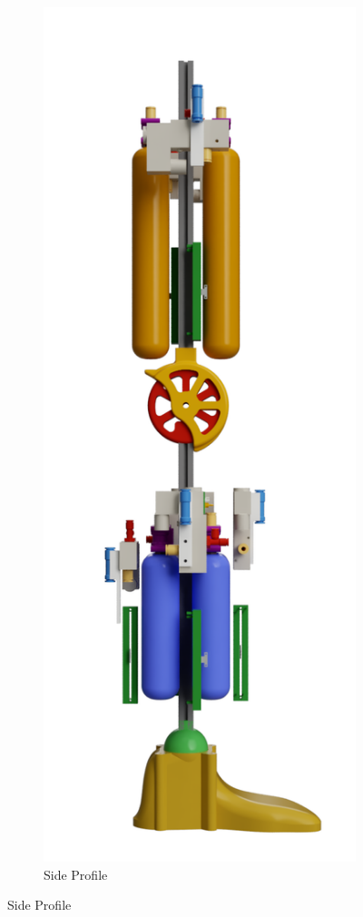 \documentclass[11pt,a4paper]{article}
\begin{document}
\begin{figure}[!hbt]
    \centering
    \begin{subfigure}[t]{0.4 \textwidth}
        \centering
        \caption{Side Profile}
        \includegraphics[scale=0.2]{Leg_Render_Side_2.PNG}

\end{subfigure}
\end{figure}
\end{document}
